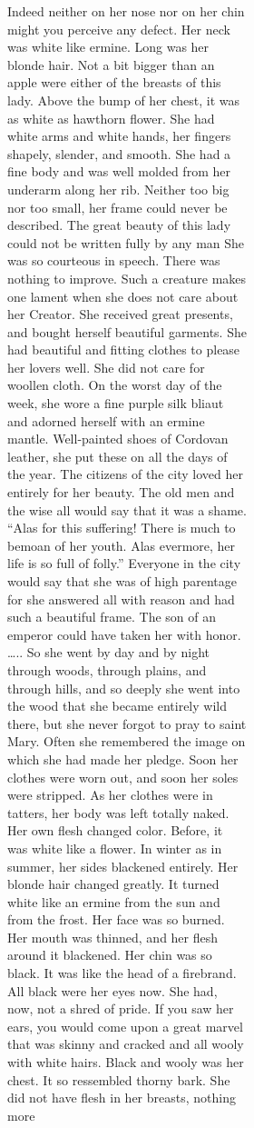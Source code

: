 \documentclass[
  letterpaper,
  DIV=11,
  numbers=noendperiod,
  oneside]{scrreprt}
\begin{document}
\begin{figure}
\begin{figure}
\begin{figure}
\begin{minipage}{0.20\linewidth}
{Indeed neither} on her nose {nor} on her chin might you perceive {any}
defect. Her neck was {white like ermine.} Long was her {blonde} hair.
{{Not a bit bigger} than an apple were} {either of the breasts of this
lady.} Above the bump of her chest, it was {as white as hawthorn
flower.} She had {white arms} and {white hands,} her fingers shapely,
slender, and smooth. She had a fine body and was well molded from her
underarm along her rib. {Neither too big nor too small,} her frame could
{never} be described. The great beauty of this lady could {not} be
written fully by {any} man She was so courteous in speech. There was
{nothing} to improve. Such a creature makes one lament when she {does
not} care about her Creator. She received great presents, and bought
herself beautiful garments. She had beautiful and fitting clothes to
please her lovers well. She {did not} care for woollen cloth. On the
worst day of the week, she wore a fine {purple silk} bliaut and adorned
herself with an ermine mantle. {Well-painted} shoes of Cordovan leather,
she put these on all the days of the year. The citizens of the city
loved her entirely for her beauty. The old men and the wise all would
say that it was a shame. ``Alas for this suffering! There is much to
bemoan of her youth. Alas evermore, her life is so full of folly.''
Everyone in the city would say that she was of high parentage for she
answered all with reason and had such a beautiful frame. The son of an
emperor could have taken her with honor. \ldots.. So she went by day and
by night {through woods, through plains, and through hills,} and so
deeply she went into the wood that she became entirely wild there, but
she {never} forgot to pray to saint Mary. Often she remembered the image
on which she had made her pledge. Soon her clothes were worn out, and
soon her soles were stripped. As her clothes were in tatters, her body
was left totally naked. Her own flesh {changed color.} Before, it was
{white like a flower.} In winter as in summer, her sides {blackened}
entirely. Her {blonde} hair changed greatly. {It turned white like an
ermine} {from the sun and from the frost.} {Her face was so {burned.}}
Her mouth was thinned, and her flesh around it {blackened.} Her chin was
so {black.} {It was like the head of a firebrand.} All {black} were her
eyes now. She had, now, {not a shred} of pride. If you saw her ears, you
would come upon a great marvel that was skinny and cracked and all wooly
with {white} hairs. {Black} and wooly was her chest. It so ressembled
thorny bark. She {did not} have flesh in her breasts, {nothing more}

\end{minipage}
\end{figure}
\end{figure}
\end{figure}
\end{document}
